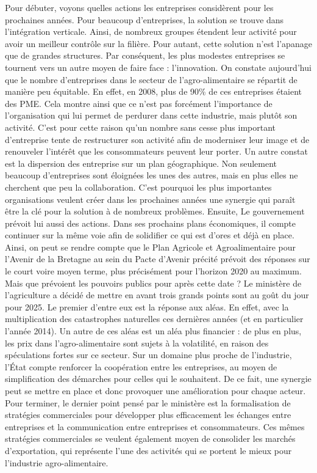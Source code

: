 \documentclass[a4paper,10pt]{report}
\begin{document}
			Pour débuter, voyons quelles actions les entreprises considèrent pour les prochaines années. Pour beaucoup d’entreprises, la solution se trouve dans l’intégration verticale. Ainsi, de nombreux groupes étendent leur activité pour avoir un meilleur contrôle sur la filière. Pour autant, cette solution n’est l’apanage que de grandes structures. Par conséquent, les plus modestes entreprises se tournent vers un autre moyen de faire face : l’innovation. On constate aujourd’hui que le nombre d’entreprises dans le secteur de l’agro-alimentaire se répartit de manière peu équitable. En effet, en 2008, plus de 90\% de ces entreprises étaient des PME. Cela montre ainsi que ce n’est pas forcément l’importance de l’organisation qui lui permet de perdurer dans cette industrie, mais plutôt son activité. C’est pour cette raison qu’un nombre sans cesse plus important d’entreprise tente de restructurer son activité afin de moderniser leur image et de renouveler l’intérêt que les consommateurs peuvent leur porter. Un autre constat est la dispersion des entreprise sur un plan géographique. Non seulement beaucoup d’entreprises sont éloignées les unes des autres, mais en plus elles ne cherchent que peu la collaboration. C’est pourquoi les plus importantes organisations veulent créer dans les prochaines années une synergie qui paraît être la clé pour la solution à de nombreux problèmes.
			Ensuite, Le gouvernement prévoit lui aussi des actions. Dans ses prochains plans économiques, il compte continuer sur la même voie afin de solidifier ce qui est d’ores et déjà en place. Ainsi, on peut se rendre compte que le Plan Agricole et Agroalimentaire pour l’Avenir de la Bretagne au sein du Pacte d’Avenir précité prévoit des réponses sur le court voire moyen terme, plus précisément pour l’horizon 2020 au maximum. Mais que prévoient les pouvoirs publics pour après cette date ? Le ministère de l’agriculture a décidé de mettre en avant trois grands points sont au goût du jour pour 2025. Le premier d’entre eux est la réponse aux aléas. En effet, avec la multiplication des catastrophes naturelles ces dernières années (et en particulier l’année 2014). Un autre de ces aléas est un aléa plus financier : de plus en plus, les prix dans l’agro-alimentaire sont sujets à la volatilité, en raison des spéculations fortes sur ce secteur. Sur un domaine plus proche de l’industrie, l’État compte renforcer la coopération entre les entreprises, au moyen de simplification des démarches pour celles qui le souhaitent. De ce fait, une synergie peut se mettre en place et donc provoquer une amélioration pour chaque acteur. Pour terminer, le dernier point pensé par le ministère est la formalisation de stratégies commerciales pour développer plus efficacement les échanges entre entreprises et la communication entre entreprises et consommateurs. Ces mêmes stratégies commerciales se veulent également moyen de consolider les marchés d’exportation, qui représente l’une des activités qui se portent le mieux pour l’industrie agro-alimentaire.
			
\end{document}
